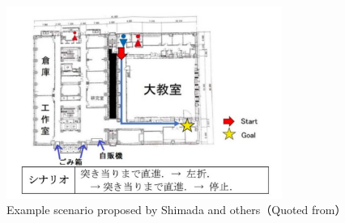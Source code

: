 \begin{figure}[htbp]
  \centering
   \includegraphics[width=90mm]{images/pdf/shimada/scenario.pdf}
   \caption[Example scenario proposed by Shimada and others]{Example scenario proposed by Shimada and others（Quoted from\cite{shimada2020}）}
   \label{fig:shimada_scenario}
\end{figure}